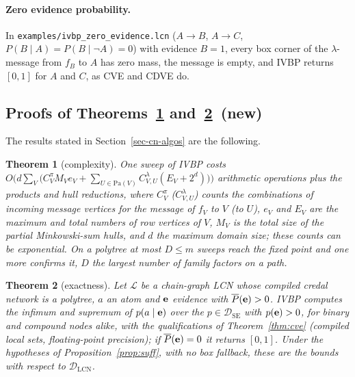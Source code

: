 \documentclass{article} %
\DeclareRobustCommand{\rev}[1]{{\color{blue}#1}}
\newenvironment{revblock}{\color{blue}}{}
\newcommand{\newtag}{\texorpdfstring{~\rev{(new)}}{}}
\newtheorem{theorem}{Theorem}
\newcommand{\DSE}{\mathcal{D}_{\mathrm{SE}}}
\newcommand{\DLCN}{\mathcal{D}_{\mathrm{LCN}}}
\providecommand{\Pa}{\mathrm{Pa}}
\begin{document}
\paragraph{Zero evidence probability.}
In \texttt{examples/ivbp\_zero\_evidence.lcn} ($A\to B$, $A\to C$, $P(B\mid A)=P(B\mid\lnot
A)=0$) with evidence $B{=}1$, every box corner of the $\lambda$-message from $f_B$ to $A$ has
zero mass, the message is empty, and IVBP returns $[0,1]$ for $A$ and $C$, as CVE and CDVE
do.


\subsection{Proofs of Theorems~\ref{thm:ibp-cplx} and~\ref{thm:ibp}\newtag}

\begin{revblock}The results stated in Section~\ref{sec-cn-algos} are the following.\end{revblock}

\begin{theorem}[complexity]\label{thm:ibp-cplx}
    One sweep of IVBP costs $O\bigl(d\sum_V \bigl(C^{\pi}_V M_V e_V+\sum_{U\in\Pa(V)}C^{\lambda}_{V,U}(E_V+2^{d})\bigr)\bigr)$ arithmetic operations plus the products and hull reductions, where $C^{\pi}_V$ ($C^{\lambda}_{V,U}$) counts the combinations of incoming message vertices for the message of $f_V$ to $V$ (to $U$), $e_V$ and $E_V$ are the maximum and total numbers of row vertices of $V$, $M_V$ is the total size of the partial Minkowski-sum hulls, and $d$ the maximum domain size; these counts can be exponential. On a polytree at most $D\le m$ sweeps reach the fixed point and one more confirms it, $D$ the largest number of family factors on a path.
\end{theorem}

\begin{theorem}[exactness]\label{thm:ibp}
    Let $\mathcal{L}$ be a chain-graph LCN whose compiled credal network is a polytree, $a$ an atom and $\mathbf{e}$ evidence with $\overline{P}(\mathbf{e})>0$. IVBP computes the infimum and supremum of $p(a\mid\mathbf{e})$ over the $p\in\DSE$ with $p(\mathbf{e})>0$, for binary and compound nodes alike, with the qualifications of Theorem~\ref{thm:cve} (compiled local sets, floating-point precision); if $\overline{P}(\mathbf{e})=0$ it returns $[0,1]$. Under the hypotheses of Proposition~\ref{prop:suff}, with no box fallback, these are the bounds with respect to $\DLCN$.
\end{theorem}
\end{document}
